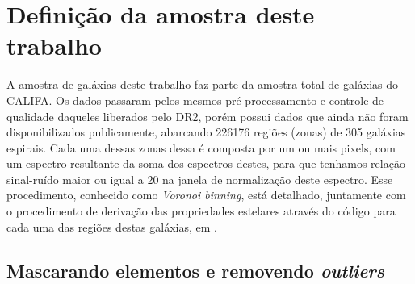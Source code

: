 \section{Definição da amostra deste trabalho}
\label{sec:amostra:definicao}

A amostra de galáxias deste trabalho faz parte da amostra total de galáxias do CALIFA. Os dados
passaram pelos mesmos pré-processamento e controle de qualidade daqueles liberados pelo DR2, porém
possui dados que ainda não foram disponibilizados publicamente, abarcando 226176 regiões (zonas) de
305 galáxias espirais. Cada uma dessas zonas dessa é composta por um ou mais pixels, com um espectro
resultante da soma dos espectros destes, para que tenhamos relação sinal-ruído maior ou igual a 20
na janela de normalização deste espectro. Esse procedimento, conhecido como {\em Voronoi binning},
está detalhado, juntamente com o procedimento de derivação das propriedades estelares através do
código \starlight para cada uma das regiões destas galáxias, em \citet{CidFernandes.etal.2013a}.

\subsection{Mascarando elementos e removendo {\em outliers}}
\label{sec:amostra:mask}

